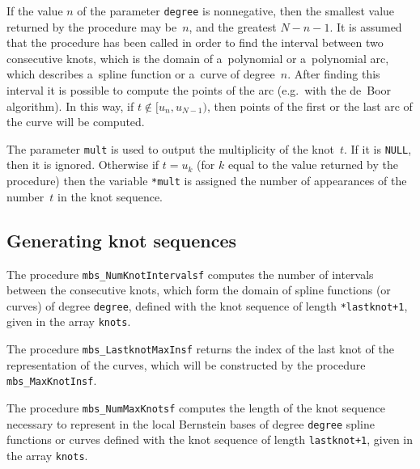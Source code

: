 If the value $n$ of the parameter \texttt{degree} is nonnegative, then
the smallest value returned by the procedure may be~$n$, and the greatest
$N-n-1$. It is assumed that the procedure has been called in order to
find the interval between two consecutive knots, which is the domain
of a~polynomial or a~polynomial arc, which describes a~spline function
or a~curve of degree~$n$. After finding this interval it is possible
to compute the points of the arc (e.g.\ with the de~Boor algorithm).
In this way, if $t\notin[u_n,u_{N-1})$, then points of the first
or the last arc of the curve will be computed.

The parameter \texttt{mult} is used to output the multiplicity of the knot~$t$.
If it is \texttt{NULL}, then it is ignored. Otherwise if $t=u_k$
(for $k$ equal to the value returned by the procedure) then the variable
\texttt{*mult} is assigned the number of appearances of the number~$t$
in the knot sequence.


\subsection{Generating knot sequences}

\hspace*{\parindent}The procedure \texttt{mbs\_NumKnotIntervalsf} computes
the number of intervals between the consecutive knots, which form the domain
of spline functions (or curves) of degree \texttt{degree}, defined with
the knot sequence of length \texttt{*lastknot+1}, given in the array
\texttt{knots}.

\vspace{\bigskipamount}
\begin{sloppypar}
The procedure \texttt{mbs\_LastknotMaxInsf} returns the index of the last knot
of the representation of the curves, which will be constructed by the
procedure \texttt{mbs\_MaxKnotInsf}.%
\end{sloppypar}

\vspace{\bigskipamount}
The procedure \texttt{mbs\_NumMaxKnotsf} computes the length of the
knot sequence necessary to represent in the local Bernstein bases of
degree \texttt{degree} spline functions or curves defined with the knot
sequence of length \texttt{lastknot+1}, given in the array \texttt{knots}.

